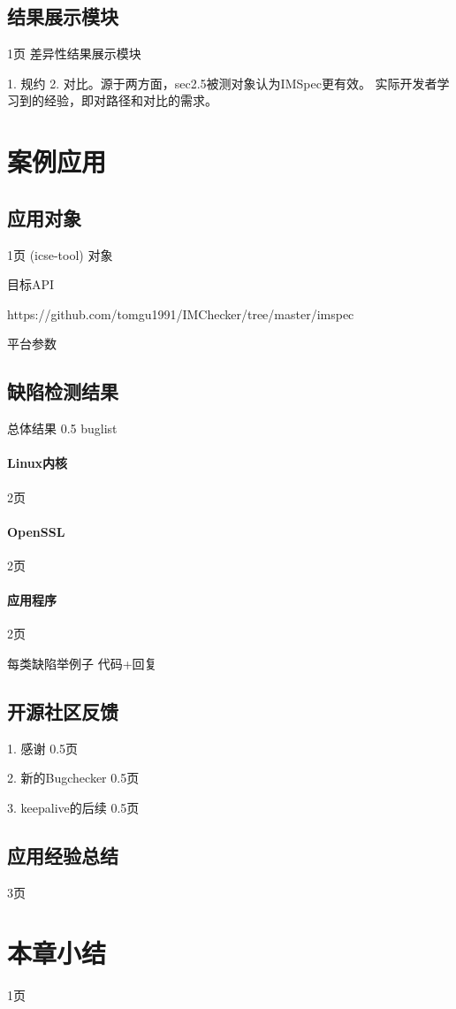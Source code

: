 \subsection{结果展示模块}
1页
差异性结果展示模块

1. 规约 2. 对比。源于两方面，sec2.5被测对象认为IMSpec更有效。
实际开发者学习到的经验，即对路径和对比的需求。

\section{案例应用}
\label{sec:4.4}
\subsection{应用对象}
1页
(icse-tool)
对象

目标API

https://github.com/tomgu1991/IMChecker/tree/master/imspec

平台参数



\subsection{缺陷检测结果}

总体结果
0.5
buglist

\paragraph{Linux内核}
2页

\paragraph{OpenSSL}
2页

\paragraph{应用程序}
2页

每类缺陷举例子
代码+回复


\subsection{开源社区反馈}
1. 感谢
0.5页

2. 新的Bugchecker
0.5页

3. keepalive的后续
0.5页

\subsection{应用经验总结}

3页

\section{本章小结}
1页